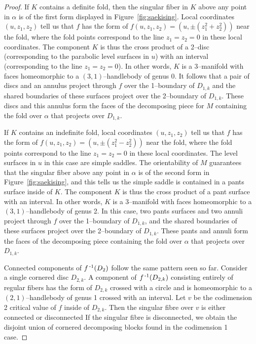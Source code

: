 \begin{proof}
	If $K$ contains a definite fold, then the singular fiber in $K$ above any point in $\alpha$ is of the first form displayed in Figure~\ref{fig:saekising}.
	Local coordinates $(u,z_1,z_2)$ tell us that $f$ has the form of $f(u,z_1,z_2)=(u,\pm(z_1^2+z_2^2))$ near the fold, where the fold points correspond to the line $z_1=z_2=0$ in these local coordinates.
	The component $K$ is thus the cross product of a 2--disc (corresponding to the parabolic level surfaces in $u$) with an interval (corresponding to the line $z_1=z_2=0$).
	In other words, $K$ is a 3--manifold with faces homeomorphic to a $(3,1)$--handlebody of genus 0.
	It follows that a pair of discs and an annulus project through $f$ over the 1--boundary of $D_{1,k}$ and the shared boundaries of these surfaces project over the 2--boundary of $D_{1,k}$.
	These discs and this annulus form the faces of the decomposing piece for $M$ containing the fold over $\alpha$ that projects over $D_{1,k}$.
	
	If $K$ contains an indefinite fold,
	local coordinates $(u,z_1,z_2)$ tell us that $f$ has the form of $f(u,z_1,z_2)=(u,\pm(z_1^2-z_2^2))$ near the fold, where the fold points correspond to the line $z_1=z_2=0$ in these local coordinates.
	The level surfaces in $u$ in this case are simple saddles.
	The orientability of $M$ guarantees that the singular fiber above any point in $\alpha$ is of the second form in Figure~\ref{fig:saekising}, and this tells us the simple saddle is contained in a pants surface inside of $K$.
	The component $K$ is thus the cross product of a pant surface with an interval.
	In other words, $K$ is a 3--manifold with faces homeomorphic to a $(3,1)$--handlebody of genus 2.
	In this case, two pants surfaces and two annuli project through $f$ over the 1--boundary of $D_{1,k}$, and the shared boundaries of these surfaces project over the 2--boundary of $D_{1,k}$.
	These pants and annuli form the faces of the decomposing piece containing the fold over $\alpha$ that projects over $D_{1,k}$. 
		
	Connected components of $f^{\,\text{-}1}(D_2)$ follow the same pattern seen so far.
	Consider a single cornered disc $D_{2,k}$.
	A component of $f^{\,\text{-}1}(D_{2,k})$ consisting entirely of regular fibers has the form of $D_{2,k}$ crossed with a circle and is homeomorphic to a $(2,1)$--handlebody of genus 1 crossed with an interval.
	Let $v$ be the codimension 2 critical value of $f$ inside of $D_{2,k}$.
	Then the singular fibre over $v$ is either connected or disconnected
	If the singular fibre is disconnected, we obtain the disjoint union of cornered decomposing blocks found in the codimension 1 case.
	

\end{proof}
